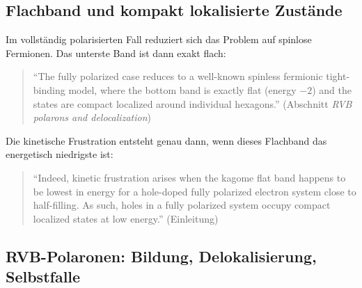 \subsection{Flachband und kompakt lokalisierte Zustände}

Im vollständig polarisierten Fall reduziert sich das Problem auf spinlose
Fermionen. Das unterste Band ist dann exakt flach:
\begin{quote}\QM
\enquote{The fully polarized case reduces to a well-known spinless fermionic
tight-binding model, where the bottom band is exactly flat (energy $-2$) and
the states are compact localized around individual hexagons.}
(Abschnitt \emph{RVB polarons and delocalization})
\end{quote}
Die kinetische Frustration entsteht genau dann, wenn dieses Flachband das
energetisch niedrigste ist:
\begin{quote}\QM
\enquote{Indeed, kinetic frustration arises when the kagome flat band happens
to be lowest in energy for a hole-doped fully polarized electron system close
to half-filling. As such, holes in a fully polarized system occupy compact
localized states at low energy.} (Einleitung)
\end{quote}

\subsection{RVB-Polaronen: Bildung, Delokalisierung, Selbstfalle}

